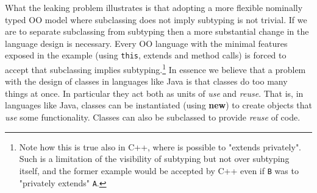 What the leaking problem illustrates is that
adopting a more flexible
nominally typed
OO model where subclassing does not imply subtyping is not trivial. 
If we are to separate subclassing from subtyping then a more substantial
change in the language design is necessary.  Every OO language with
the minimal features exposed in the example (using \lstinline{this},
extends and method calls) is forced to accept that subclassing implies
subtyping.\footnote{ Note how this is true also in C++, where is
  possible to "extends privately". Such is a limitation of the
  visibility of subtyping but not over subtyping itself, and the
  former example would be accepted by C++ even if \lstinline{B} was to
  "privately extends" \lstinline{A}.}
In essence we believe that a problem with the design of classes in languages like Java
is that classes do too many things at once. In particular they act
both as units of \emph{use} and \emph{reuse}.
That is, in languages like Java, classes can be
instantiated (using {\bf new}) to create objects that \emph{use} some 
functionality. Classes can also be subclassed to provide \emph{reuse}
of code.  



\begin{comment}
An iconic example on why connecting inheritance/code reuse and
subtpying is problematic is provided by the
historic\cite{LaLonde:1991:SSS:110673.110679}: A reasonable
implementation for a \Q@Set@ may be easy to extend into a \Q@Bag@
keeping tracks of how many times an element occurs.  We would just add
some state and override a couple of methods.\bruno{Are we going to
  present this example in the paper solved in 42, for example? 
I think I would expect to see it.}

However, our subclassing would break Liskov substitution principle (LSP)~\cite{martin2000design}: not all bags are sets!
Of course, one could retroactivelly fix this problem by introducing \Q@AbstractSetOrBag@
and making both \Q@Bag@ and \Q@Set@ inherit from it.
This looks unnatural, since \Q@Set@ would extend it without adding anything,
and we would be surprised to find a use of the type \Q@AbstractSetOrBag@.
Worst, if we was to constantly apply this mentalty, we would introduce a very high number
of abstract classes that are not supposed to be used as types, and that will clutter the 
public interface of our classes and our code project as a whole.
\end{comment}

